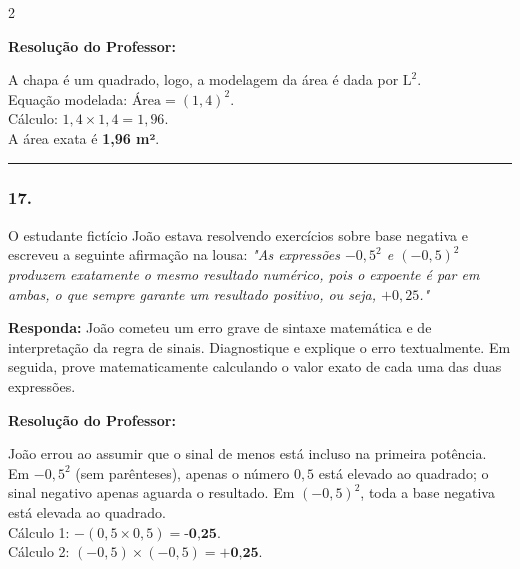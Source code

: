 \begin{multicols*}{2}
\ifgabarito
    \begin{tcolorbox}[colback=CorTitUm!5, colframe=CorTitUm, boxrule=1pt, arc=4pt, left=6pt, right=6pt, top=6pt, bottom=6pt]
    \small\textbf{\textcolor{CorTitUm}{Resolução do Professor:}}\par\vspace{0.1cm}
    \color{CinzaEscuro}
    A chapa é um quadrado, logo, a modelagem da área é dada por $ \text{L}^{2} $.\\
    Equação modelada: $ \text{Área} = (1,4)^{2} $.\\
    Cálculo: $ 1,4 \times 1,4 = 1,96 $.\\
    A área exata é \textbf{1,96 m²}.
    \end{tcolorbox}
\fi

\par\vspace{\espacoQuestao}

\noindent\textcolor{CorLinha}{\rule{\linewidth}{0.5pt}} 
\par\vspace{\espacoPreQuestao}
\subsubsection*{17.} O estudante fictício João estava resolvendo exercícios sobre base negativa e escreveu a seguinte afirmação na lousa: 
\textit{"As expressões $ -0,5^{2} $ e $ (-0,5)^{2} $ produzem exatamente o mesmo resultado numérico, pois o expoente é par em ambas, o que sempre garante um resultado positivo, ou seja, $ +0,25 $."}
\begin{boxresponda}
\textbf{Responda:} João cometeu um erro grave de sintaxe matemática e de interpretação da regra de sinais. Diagnostique e explique o erro textualmente. Em seguida, prove matematicamente calculando o valor exato de cada uma das duas expressões.
\end{boxresponda}

\ifgabarito
    \begin{tcolorbox}[colback=CorTitUm!5, colframe=CorTitUm, boxrule=1pt, arc=4pt, left=6pt, right=6pt, top=6pt, bottom=6pt]
    \small\textbf{\textcolor{CorTitUm}{Resolução do Professor:}}\par\vspace{0.1cm}
    \color{CinzaEscuro}
    João errou ao assumir que o sinal de menos está incluso na primeira potência. Em $ -0,5^{2} $ (sem parênteses), apenas o número $ 0,5 $ está elevado ao quadrado; o sinal negativo apenas aguarda o resultado. Em $ (-0,5)^{2} $, toda a base negativa está elevada ao quadrado.\\
    Cálculo 1: $ - (0,5 \times 0,5) = \textbf{-0,25} $.\\
    Cálculo 2: $ (-0,5) \times (-0,5) = \textbf{+0,25} $.
    \end{tcolorbox}
\fi


\end{multicols*}
